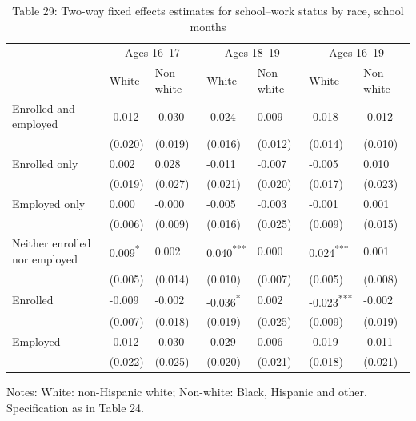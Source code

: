 \documentclass[12pt]{article}
\begin{document}
\begin{table}
\centering
\caption{Table 29: Two-way fixed effects estimates for school--work status by race, school months}

\small
\begin{tabular}{p{}p{}p{}p{}p{}p{}p{}}
\toprule
 & \multicolumn{2}{c}{Ages 16--17} & \multicolumn{2}{c}{Ages 18--19} & \multicolumn{2}{c}{Ages 16--19} \\

 & White & Non-white & White & Non-white & White & Non-white \\
\midrule
Enrolled and employed & -0.012 & -0.030 & -0.024 & 0.009 & -0.018 & -0.012 \\
 & (0.020) & (0.019) & (0.016) & (0.012) & (0.014) & (0.010) \\
Enrolled only & 0.002 & 0.028 & -0.011 & -0.007 & -0.005 & 0.010 \\
 & (0.019) & (0.027) & (0.021) & (0.020) & (0.017) & (0.023) \\
Employed only & 0.000 & -0.000 & -0.005 & -0.003 & -0.001 & 0.001 \\
 & (0.006) & (0.009) & (0.016) & (0.025) & (0.009) & (0.015) \\
Neither enrolled nor employed & 0.009\textsuperscript{*} & 0.002 & 0.040\textsuperscript{***} & 0.000 & 0.024\textsuperscript{***} & 0.001 \\
 & (0.005) & (0.014) & (0.010) & (0.007) & (0.005) & (0.008) \\
Enrolled & -0.009 & -0.002 & -0.036\textsuperscript{*} & 0.002 & -0.023\textsuperscript{***} & -0.002 \\
 & (0.007) & (0.018) & (0.019) & (0.025) & (0.009) & (0.019) \\
Employed & -0.012 & -0.030 & -0.029 & 0.006 & -0.019 & -0.011 \\
 & (0.022) & (0.025) & (0.020) & (0.021) & (0.018) & (0.021) \\
\bottomrule
\end{tabular}



\noindent\small Notes: White: non-Hispanic white; Non-white: Black, Hispanic and other. Specification as in Table 24.

\end{table}
\end{document}
